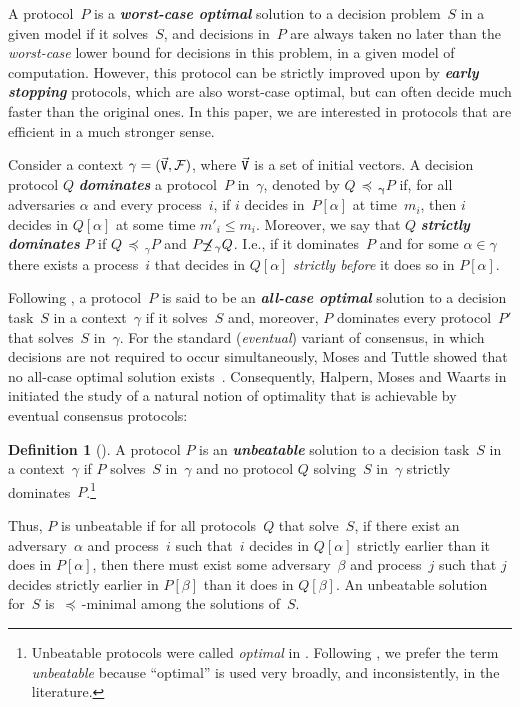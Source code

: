 \documentclass[11pt]{article}
\theoremstyle{definition}
\newtheorem{definition}{Definition}
\newcommand{\defemph}[1]{\textbf{\textit{#1}}}
\newcommand{\Fmodel}{{\cal F}}
\newcommand{\Vals}{{\tt V}}
\newcommand{\Vecs}{\vec{\Vals}}
\newcommand{\dom}{\,{\preceq}\,}
\begin{document}
A protocol~$P$ is a \defemph{worst-case optimal} solution to a decision problem~$S$ in a given model
if it solves~$S$, and decisions in~$P$ are always taken no later than the {\em worst-case} lower bound for decisions in this problem, in a given model of computation.
However, this protocol can be strictly improved upon by \defemph{early stopping} protocols,
which are also worst-case optimal, but can often decide much faster than the original ones.
In this paper, we are interested in protocols that are efficient in a much stronger sense.

Consider a  context $\gamma=(\Vecs,\Fmodel)$, where $\Vecs$ is a set of initial vectors.
A decision protocol $Q$ \defemph{dominates} a protocol~$P$ in~$\gamma$, denoted by $Q\boldsymbol{\dom_\gamma} P$ if, for all adversaries $\alpha$ and every process~$i$,
if $i$ decides in~$P[\alpha]$ at time~$m_i$, then $i$ decides in $Q[\alpha]$ at some time
$m'_i\le m_i$. Moreover, we say that $Q$  \defemph{strictly dominates} $P$
if $Q\dom_\gamma P$ and  $P\!\!\boldsymbol{\not}\!\!\!\dom_\gamma Q$. I.e., if it dominates~$P$ and for some $\alpha\in\gamma$ there exists a process~$i$ that decides in $Q[\alpha]$ {\em strictly before} it does so in $P[\alpha]$.

Following \cite{HMT11},
a protocol~$P$ is said to be an  \defemph{all-case optimal} solution to a decision task~$S$ in a context~$\gamma$ if it solves~$S$ and, moreover, $P$ dominates every protocol~$P'$ that solves~$S$ in~$\gamma$.
For the standard ({\em eventual}) variant of consensus, in which decisions are not required to occur simultaneously, Moses and Tuttle showed that no all-case optimal solution exists~\cite{MT}.
Consequently, Halpern, Moses and Waarts in \cite{HalMoWa2001} initiated the study of a natural notion of optimality
that is achievable by eventual consensus protocols:

\begin{definition}[\cite{HalMoWa2001}]
A protocol $P$ is an \defemph{unbeatable} solution to a decision task~$S$ in a context~$\gamma$ if $P$ solves~$S$ in~$\gamma$ and no protocol $Q$ solving~$S$ in~$\gamma$ strictly dominates~$P$.\footnote{Unbeatable protocols were called {\em optimal} in \cite{HalMoWa2001}. Following \cite{AYY-DISC},
we prefer the term {\em unbeatable} because ``optimal'' is used very broadly, and inconsistently, in the literature.}
\end{definition}

Thus, $P$ is unbeatable if for all protocols~$Q$ that solve~$S$, if there exist an adversary~$\alpha$ and process~$i$ such that~$i$
decides in $Q[\alpha]$ strictly earlier than it does in $P[\alpha]$, then there must exist some adversary~$\beta$ and process~$j$ such that $j$ decides strictly earlier in $P[\beta]$ than it does in $Q[\beta]$. An unbeatable solution for~$S$ is $\dom$-minimal among the solutions of~$S$.
\end{document}
